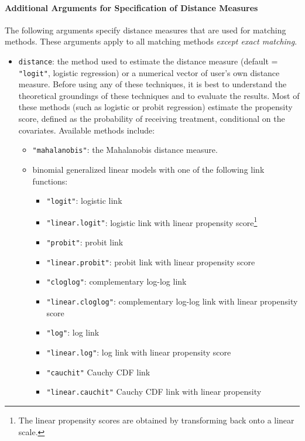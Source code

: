 \paragraph{Additional Arguments for Specification of
  Distance Measures}
\label{subsubsec:inputs-all}

The following arguments specify distance measures that are used for
matching methods. These arguments apply to all matching methods {\it
  except exact matching}.

\begin{itemize}
  
\item \texttt{distance}: the method used to estimate the distance
  measure (default = {\tt "logit"}, logistic regression) or a
  numerical vector of user's own distance measure.  Before using any
  of these techniques, it is best to understand the theoretical
  groundings of these techniques and to evaluate the results.  Most of
  these methods (such as logistic or probit regression) estimate the
  propensity score, defined as the probability of receiving treatment,
  conditional on the covariates.  Available methods include:
  \begin{itemize}
  \item {\tt "mahalanobis"}: the Mahalanobis distance measure.
  \item binomial generalized linear models with one of the following
    link functions:
    \begin{itemize}
    \item \texttt{"logit"}: logistic link 
    \item {\tt "linear.logit"}: logistic link with linear propensity
      score\footnote{The linear propensity scores are obtained by
        transforming back onto a linear scale.}
    \item \texttt{"probit"}: probit link
    \item {\tt "linear.probit"}: probit link with linear propensity
      score
    \item {\tt "cloglog"}: complementary log-log link
    \item {\tt "linear.cloglog"}: complementary log-log link with linear
      propensity score
    \item {\tt "log"}: log link
    \item {\tt "linear.log"}: log link with linear propensity score
    \item {\tt "cauchit"} Cauchy CDF link
    \item {\tt "linear.cauchit"} Cauchy CDF link with linear propensity

\end{itemize}
\end{itemize}
\end{itemize}
